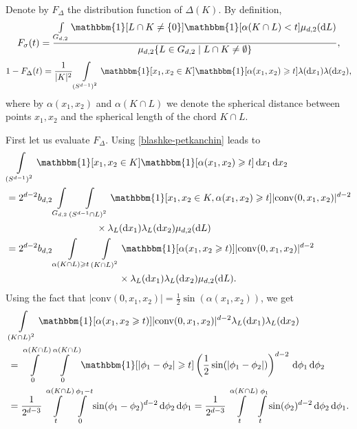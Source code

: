 \documentclass[12pt, reqno]{amsart}
\begin{document}
Denote by $F_\Delta$ the distribution function of $\Delta(K)$.
By definition,
\begin{align*}
    F_{\sigma}(t) = \frac{\int\limits_{G_{d,2}}\mathbbm{1}[L \cap K \neq \{0\}]\mathbbm{1}[\alpha(K\cap L) < t] \mu_{d,2}(\mathrm dL)}{\mu_{d,2}\{L \in G_{d,2} \mid L\cap K  \neq \emptyset\}},
\end{align*}
\begin{align*}
    1 - F_\Delta(t) = \frac{1}{|K|^2}\int\limits_{\left( S^{d-1}\right)^2}\mathbbm{1}[x_1, x_2 \in K]\mathbbm{1}[\alpha(x_1, x_2) \geqslant t] \lambda(\mathrm d x_1)\lambda(\mathrm d x_2),
\end{align*}
where by $\alpha(x_1, x_2)$ and $\alpha(K\cap L)$ we denote the spherical distance between points $x_1,x_2$ and the spherical length of the chord $K\cap L$.

First let us evaluate $F_\Delta$. Using \eqref{blashke-petkanchin} leads to
\begin{align*}
    &\int\limits_{\left( S^{d-1}\right)^2}\mathbbm{1}[x_1, x_2 \in K]\mathbbm{1}[\alpha(x_1, x_2) \geqslant t] \dd x_1\dd x_2  \\
    & = 2^{d-2}b_{d,2}\int\limits_{G_{d,2}}\int\limits_{\left(S^{d-1}\cap L\right)^2} \mathbbm{1}[x_1, x_2 \in K, \alpha(x_1, x_2) \geqslant t] |\mathrm{conv}(0, x_1, x_2)|^{d-2} 
    \\
    &\hphantom{ 2^{d-2}b_{d,2}\int\limits_{G_{d,2}}\int\limits_{\left(L\cap S^{d-1}\right)^2} }\times\lambda_{L}(\mathrm{d}x_1)\lambda_{L}(\mathrm{d}x_2)\mu_{d,2}(\mathrm{d}L) \\
    & =2^{d-2}b_{d,2}\int\limits_{\alpha(K\cap L) \geqslant t}\int\limits_{\left(K \cap L\right)^2}\mathbbm{1}[\alpha(x_1, x_2 \geqslant t)]|\mathrm{conv}(0, x_1, x_2)|^{d-2}
    \\
    &\hphantom{=2^{d-2}b_{d,2}\int\limits_{\alpha(K\cap L) \geqslant x}\int\limits_{\left(K \cap L\right)^2}}\times\lambda_{L}(\mathrm{d}x_1)\lambda_{L}(\mathrm{d}x_2)\mu_{d,2}(\mathrm{d}L).
\end{align*}
Using the fact that $|\mathrm{conv}(0, x_1, x_2)| = \frac{1}{2}\sin(\alpha(x_1, x_2))$, we get
\begin{align*}
    &\int\limits_{\left(K \cap L\right)^2}\mathbbm{1}[\alpha(x_1, x_2 \geqslant t)]|\mathrm{conv}(0, x_1, x_2)|^{d-2} \lambda_{L}(\mathrm{d}x_1)\lambda_{L}(\mathrm{d}x_2)  \\
    &=\int\limits_{0}^{\alpha(K \cap L)}\int\limits_{0}^{\alpha(K \cap L)}\mathbbm{1}[|\phi_1 - \phi_2| \geqslant t]\left(\frac{1}{2}\sin(|\phi_1 - \phi_2|)\right)^{d-2} \dd \phi_1\dd \phi_2 \\
    &= \frac{1}{2^{d-3}}\int\limits_t^{\alpha(K \cap L)}\int\limits_0^{\phi_1 - t}\sin(\phi_1 - \phi_2)^{d-2} \dd \phi_2\dd \phi_1 = \frac{1}{2^{d-3}}\int\limits_t^{\alpha(K \cap L)}\int\limits_t^{\phi_1}\sin(\phi_2)^{d-2} \dd \phi_2\dd \phi_1.
\end{align*}
\end{document}

